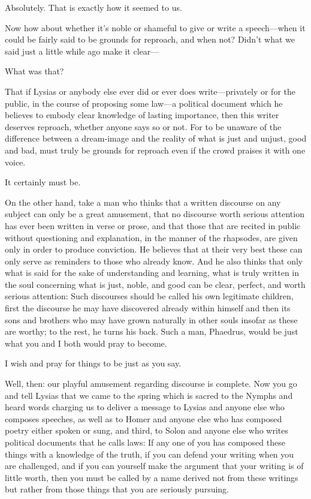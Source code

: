 \sayphaedrus Absolutely. That is exactly how it seemed to us.

\saysocrates Now how about whether it's noble or shameful to give
or write a speech---when it could be fairly said to be grounds for
reproach, and when not? Didn't what we said just a little while ago make
it clear---

\sayphaedrus What was that?

\saysocrates That if Lysias or anybody else ever did or ever does
write---privately or for the public, in the course of proposing some
law---a political document which he believes to embody clear knowledge
of lasting importance, then this writer deserves reproach, whether
anyone says so or not. For to be unaware of the difference between a
dream-image and the reality of what is just and unjust, good and
bad, must truly be grounds for reproach even if the crowd praises it
with one voice.

\sayphaedrus It certainly must be.

\saysocrates On the other hand, take a man who thinks that a written
discourse on any subject can only be a great amusement, that no
discourse worth serious attention has ever been written in verse or
prose, and that those that are recited in public without questioning and
explanation, in the manner of the rhapsodes, are given
only in order to produce conviction. He believes that at their very best
these can only serve as reminders to those who already know. And he also
thinks that only what is said for the sake of understanding and
learning, what is truly written in the soul concerning what is just,
noble, and good can be clear, perfect, and worth serious attention: Such
discourses should be called his own legitimate children, first the
discourse he may have discovered already within himself and then
its sons and brothers who may have grown naturally in other souls
insofar as these are worthy; to the rest, he turns his back. Such a man,
Phaedrus, would be just what you and I both would pray to become.

\sayphaedrus I wish and pray for things to be just as you say.

\saysocrates Well, then: our playful amusement regarding discourse is
complete. Now you go and tell Lysias that we came to the spring which is
sacred to the Nymphs and heard words charging us to deliver a message
to Lysias and anyone else who composes speeches, as well as to
Homer and anyone else who has composed poetry either spoken or sung, and
third, to Solon and anyone else who writes political documents that he
calls laws: If any one of you has composed these things with a knowledge
of the truth, if you can defend your writing when you are challenged,
and if you can yourself make the argument that your writing is of little
worth, then you must be called by a name derived not from these writings
but rather from those things that you are seriously pursuing.

